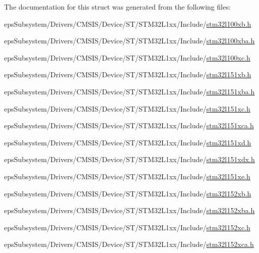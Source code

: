 The documentation for this struct was generated from the following files\-:\begin{DoxyCompactItemize}
\item 
eps\-Subsystem/\-Drivers/\-C\-M\-S\-I\-S/\-Device/\-S\-T/\-S\-T\-M32\-L1xx/\-Include/\hyperlink{stm32l100xb_8h}{stm32l100xb.\-h}\item 
eps\-Subsystem/\-Drivers/\-C\-M\-S\-I\-S/\-Device/\-S\-T/\-S\-T\-M32\-L1xx/\-Include/\hyperlink{stm32l100xba_8h}{stm32l100xba.\-h}\item 
eps\-Subsystem/\-Drivers/\-C\-M\-S\-I\-S/\-Device/\-S\-T/\-S\-T\-M32\-L1xx/\-Include/\hyperlink{stm32l100xc_8h}{stm32l100xc.\-h}\item 
eps\-Subsystem/\-Drivers/\-C\-M\-S\-I\-S/\-Device/\-S\-T/\-S\-T\-M32\-L1xx/\-Include/\hyperlink{stm32l151xb_8h}{stm32l151xb.\-h}\item 
eps\-Subsystem/\-Drivers/\-C\-M\-S\-I\-S/\-Device/\-S\-T/\-S\-T\-M32\-L1xx/\-Include/\hyperlink{stm32l151xba_8h}{stm32l151xba.\-h}\item 
eps\-Subsystem/\-Drivers/\-C\-M\-S\-I\-S/\-Device/\-S\-T/\-S\-T\-M32\-L1xx/\-Include/\hyperlink{stm32l151xc_8h}{stm32l151xc.\-h}\item 
eps\-Subsystem/\-Drivers/\-C\-M\-S\-I\-S/\-Device/\-S\-T/\-S\-T\-M32\-L1xx/\-Include/\hyperlink{stm32l151xca_8h}{stm32l151xca.\-h}\item 
eps\-Subsystem/\-Drivers/\-C\-M\-S\-I\-S/\-Device/\-S\-T/\-S\-T\-M32\-L1xx/\-Include/\hyperlink{stm32l151xd_8h}{stm32l151xd.\-h}\item 
eps\-Subsystem/\-Drivers/\-C\-M\-S\-I\-S/\-Device/\-S\-T/\-S\-T\-M32\-L1xx/\-Include/\hyperlink{stm32l151xdx_8h}{stm32l151xdx.\-h}\item 
eps\-Subsystem/\-Drivers/\-C\-M\-S\-I\-S/\-Device/\-S\-T/\-S\-T\-M32\-L1xx/\-Include/\hyperlink{stm32l151xe_8h}{stm32l151xe.\-h}\item 
eps\-Subsystem/\-Drivers/\-C\-M\-S\-I\-S/\-Device/\-S\-T/\-S\-T\-M32\-L1xx/\-Include/\hyperlink{stm32l152xb_8h}{stm32l152xb.\-h}\item 
eps\-Subsystem/\-Drivers/\-C\-M\-S\-I\-S/\-Device/\-S\-T/\-S\-T\-M32\-L1xx/\-Include/\hyperlink{stm32l152xba_8h}{stm32l152xba.\-h}\item 
eps\-Subsystem/\-Drivers/\-C\-M\-S\-I\-S/\-Device/\-S\-T/\-S\-T\-M32\-L1xx/\-Include/\hyperlink{stm32l152xc_8h}{stm32l152xc.\-h}\item 
eps\-Subsystem/\-Drivers/\-C\-M\-S\-I\-S/\-Device/\-S\-T/\-S\-T\-M32\-L1xx/\-Include/\hyperlink{stm32l152xca_8h}{stm32l152xca.\-h}\item 

\end{DoxyCompactItemize}
